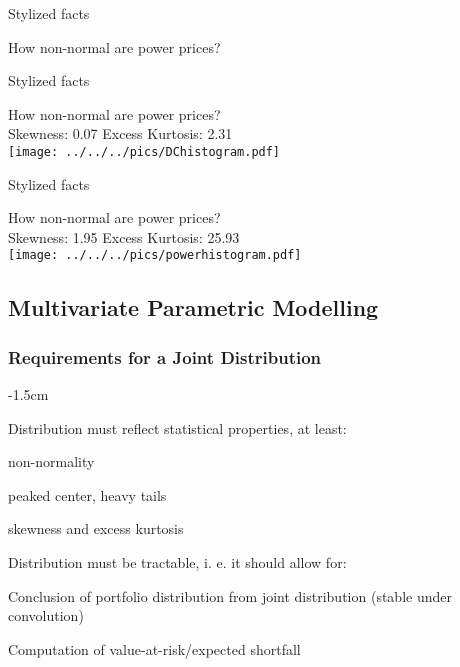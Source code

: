 {Stylized facts}
\begin{center}
How non-normal are power prices?\\
\end{center}

{Stylized facts}
\begin{center}
How non-normal are power prices?\\
Skewness: 0.07 \hspace{2cm} Excess Kurtosis: 2.31\\
\texttt{[image: ../../../pics/DChistogram.pdf]}
\end{center}

{Stylized facts} %
\begin{center}
How non-normal are power prices?\\
Skewness: 1.95 \hspace{2cm} Excess Kurtosis: 25.93\\
\texttt{[image: ../../../pics/powerhistogram.pdf]}
\end{center}

\subsection{Multivariate Parametric Modelling}
\subsubsection{Requirements for a Joint Distribution}

{-1.5cm}
\item Distribution must reflect statistical properties, at least:
    \item non-normality
    \item peaked center, heavy tails
    \item skewness and excess kurtosis
\item Distribution must be tractable, i. e. it should allow for:
    \item Conclusion of portfolio distribution from joint distribution (stable under convolution)
    \item Computation of value-at-risk/expected shortfall

